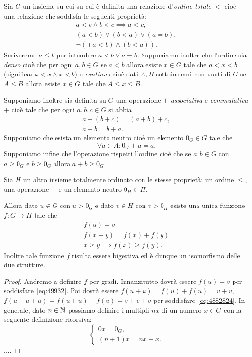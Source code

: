 \begin{theorem}
  Sia $G$ un insieme su cui su cui è definita
  una relazione d'\emph{ordine totale} $<$ cioè una relazione
  che soddisfa le seguenti proprietà:
  \begin{gather*}
    a < b \land b < c \implies a < c, \\
    (a < b) \lor (b < a) \lor (a=b), \\
    \lnot ((a < b) \land (b < a)).
  \end{gather*}
  Scriveremo $a\le b$ per intendere $a< b \lor a = b$.
  Supponiamo inoltre che l'ordine sia \emph{denso}
  cioè che per ogni $a,b\in G$ se $a < b$
  allora esiste $x\in G$ tale che $a < x < b$ (significa:
  $a < x \land x < b$) e \emph{continuo} cioè
  dati $A,B$ sottoinsiemi non vuoti di $G$ se $A\le B$
  allora esiste $x\in G$ tale che $A\le x \le B$.
  
  Supponiamo inoltre sia definita su $G$
  una operazione $+$ \emph{associativa} e \emph{commutativa}
  $+$ cioè tale che per ogni $a,b,c\in G$ si abbia
  \begin{align*}
    a + (b+c) = (a+b)+c,\\
    a + b = b + a.
  \end{align*}
  Supponiamo che esista un elemento neutro
  cioè un elemento $0_G \in G$ tale che
  \[
    \forall a\in A: 0_G + a = a.
  \]
  Supponiamo infine che l'operazione rispetti l'ordine cioè che
  se $a,b\in G$ con $a\ge 0_G$ e $b\ge 0_G$ allora $a+b\ge 0_G$.
  
  Sia $H$ un altro insieme totalmente ordinato con le stesse proprietà:
  un ordine $\le$, una operazione $+$ e un elemento neutro $0_H\in H$.
  
  Allora dato $u\in G$ con $u>0_G$ e dato $v\in H$
  con $v>0_H$ esiste una unica funzione $f\colon G \to H$ tale che
  \begin{gather}
    f(u) = v  \label{eq:49932}\\
    f(x+y) = f(x)+f(y) \label{eq:4882824}\\
    x\ge y \implies f(x) \ge f(y).
  \end{gather}
  Inoltre tale funzione $f$ risulta essere bigettiva
  ed è dunque un isomorfismo delle due strutture.
  \end{theorem}
  \begin{proof}
  Andremo a definire $f$ per gradi. Innanzitutto
  dovrà essere $f(u)=v$ per soddisfare~\eqref{eq:49932}.
  Poi dovrà essere $f(u+u) = f(u)+f(u) = v+v$,
  $f(u+u+u) = f(u+u)+f(u) = v+v+v$
  per soddisfare~\eqref{eq:4882824}.
  In generale, dato $n\in \mathbb N$ possiamo definire
  i multipli $nx$ di un numero $x\in G$ con la seguente
  definizione ricorsiva:
  \[
   \begin{cases}
   0x = 0_G, \\
   (n+1) x = nx + x.
   \end{cases}
  \]
  ....
  \end{proof}
  

